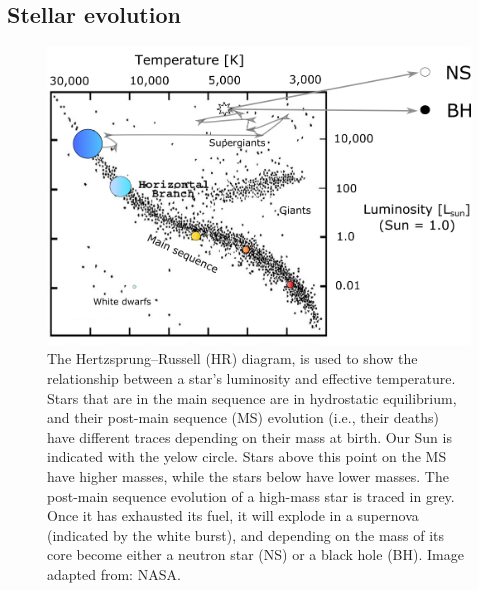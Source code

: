 \documentclass[1.5,11pt]{beavtex}
\begin{document}
\subsection{Stellar evolution}
\label{ch:Astro theory ssec:Stellar evo}

\begin{figure}[ht!]
  \centering
  \includegraphics[scale=0.50]{images/ch2/HR-diagram-HM.png}
  \caption{\selectfont The Hertzsprung–Russell (HR) diagram, is used to show the relationship between a star's luminosity and effective temperature. Stars that are in the main sequence are in hydrostatic equilibrium, and their post-main sequence (MS) evolution (i.e., their deaths) have different traces depending on their mass at birth. Our Sun is indicated with the yelow circle. Stars above this point on the MS have higher masses, while the stars below have lower masses. The post-main sequence evolution of a high-mass star is traced in grey. Once it has exhausted its fuel, it will explode in a supernova (indicated by the white burst), and depending on the mass of its core become either a neutron star (NS) or a black hole (BH). Image adapted from: NASA.}
  \label{fig:HR-diagram}
\end{figure}
\end{document}

